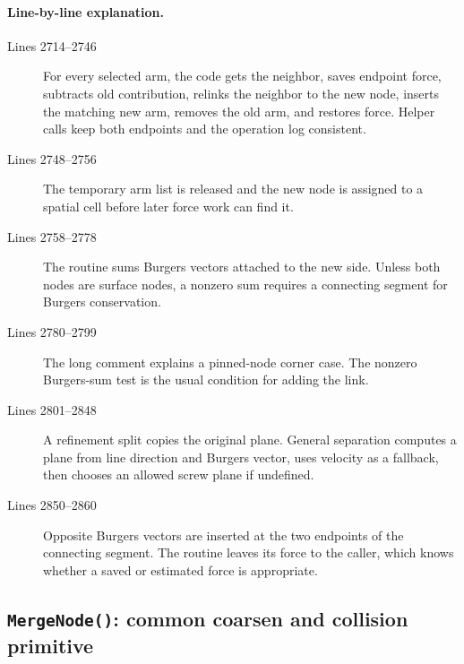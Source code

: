 \documentclass[11pt]{article}
\newcommand{\code}[1]{\texorpdfstring{\nolinkurl{#1}}{#1}}
\begin{document}
\paragraph{Line-by-line explanation.}
\begin{description}
\item[Lines 2714--2746] For every selected arm, the code gets the neighbor,
saves endpoint force, subtracts old contribution, relinks the neighbor to the
new node, inserts the matching new arm, removes the old arm, and restores
force. Helper calls keep both endpoints and the operation log consistent.
\item[Lines 2748--2756] The temporary arm list is released and the new node
is assigned to a spatial cell before later force work can find it.
\item[Lines 2758--2778] The routine sums Burgers vectors attached to the new
side. Unless both nodes are surface nodes, a nonzero sum requires a connecting
segment for Burgers conservation.
\item[Lines 2780--2799] The long comment explains a pinned-node corner case.
The nonzero Burgers-sum test is the usual condition for adding the link.
\item[Lines 2801--2848] A refinement split copies the original plane. General
separation computes a plane from line direction and Burgers vector, uses
velocity as a fallback, then chooses an allowed screw plane if undefined.
\item[Lines 2850--2860] Opposite Burgers vectors are inserted at the two
endpoints of the connecting segment. The routine leaves its force to the
caller, which knows whether a saved or estimated force is appropriate.
\end{description}

\subsection{\code{MergeNode()}: common coarsen and collision primitive}




\end{document}
